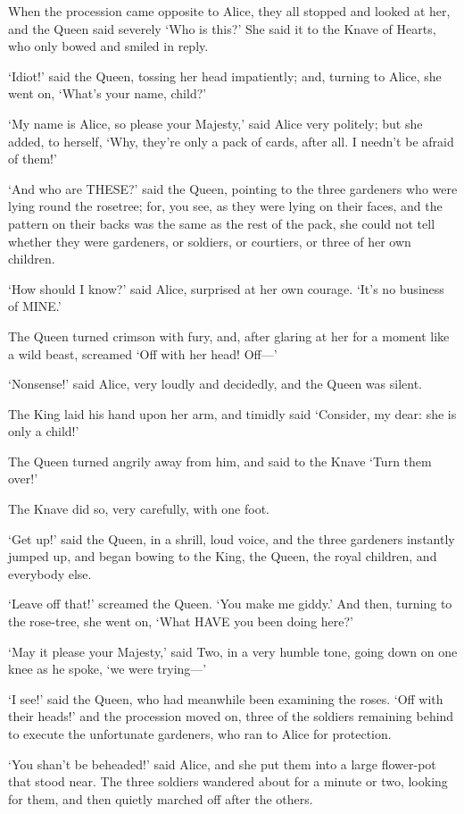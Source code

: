\documentclass[12pt]{article}
\begin{document}
\begin{Parallel}[p]{}{}
{When the procession came opposite to Alice, they all stopped and looked at her, and the Queen said severely ‘Who is this?’ She said it to the Knave of Hearts, who only bowed and smiled in reply.

‘Idiot!’ said the Queen, tossing her head impatiently; and, turning to Alice, she went on, ‘What’s your name, child?’

‘My name is Alice, so please your Majesty,’ said Alice very politely; but she added, to herself, ‘Why, they’re only a pack of cards, after all. I needn’t be afraid of them!’

‘And who are THESE?’ said the Queen, pointing to the three gardeners who were lying round the rosetree; for, you see, as they were lying on their faces, and the pattern on their backs was the same as the rest of the pack, she could not tell whether they were gardeners, or soldiers, or courtiers, or three of her own children.

‘How should I know?’ said Alice, surprised at her own courage. ‘It’s no business of MINE.’

The Queen turned crimson with fury, and, after glaring at her for a moment like a wild beast, screamed ‘Off with her head! Off—’

‘Nonsense!’ said Alice, very loudly and decidedly, and the Queen was silent.

The King laid his hand upon her arm, and timidly said ‘Consider, my dear: she is only a child!’

The Queen turned angrily away from him, and said to the Knave ‘Turn them over!’

The Knave did so, very carefully, with one foot.

‘Get up!’ said the Queen, in a shrill, loud voice, and the three gardeners instantly jumped up, and began bowing to the King, the Queen, the royal children, and everybody else.

‘Leave off that!’ screamed the Queen. ‘You make me giddy.’ And then, turning to the rose-tree, she went on, ‘What HAVE you been doing here?’

‘May it please your Majesty,’ said Two, in a very humble tone, going down on one knee as he spoke, ‘we were trying—’

‘I see!’ said the Queen, who had meanwhile been examining the roses. ‘Off with their heads!’ and the procession moved on, three of the soldiers remaining behind to execute the unfortunate gardeners, who ran to Alice for protection.

‘You shan’t be beheaded!’ said Alice, and she put them into a large flower-pot that stood near. The three soldiers wandered about for a minute or two, looking for them, and then quietly marched off after the others.

}
\end{Parallel}
\end{document}
